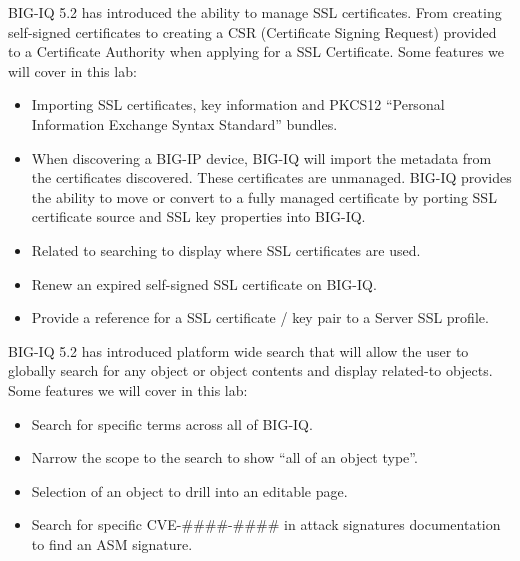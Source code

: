 \documentclass[letterpaper,10pt,english]{sphinxmanual}
\begin{document}
BIG-IQ 5.2 has introduced the ability to manage SSL certificates. From
creating self-signed certificates to creating a CSR (Certificate Signing
Request) provided to a Certificate Authority when applying for a SSL
Certificate. Some features we will cover in this lab:
\begin{itemize}
\item {} 
Importing SSL certificates, key information and PKCS12 “Personal
Information Exchange Syntax Standard” bundles.

\item {} 
When discovering a BIG-IP device, BIG-IQ will import the metadata
from the certificates discovered. These certificates are unmanaged.
BIG-IQ provides the ability to move or convert to a fully managed
certificate by porting SSL certificate source and SSL key properties
into BIG-IQ.

\item {} 
Related to searching to display where SSL certificates are used.

\item {} 
Renew an expired self-signed SSL certificate on BIG-IQ.

\item {} 
Provide a reference for a SSL certificate / key pair to a Server SSL
profile.

\end{itemize}


BIG-IQ 5.2 has introduced platform wide search that will allow the user
to globally search for any object or object contents and display
related-to objects. Some features we will cover in this lab:
\begin{itemize}
\item {} 
Search for specific terms across all of BIG-IQ.

\item {} 
Narrow the scope to the search to show “all of an object type”.

\item {} 
Selection of an object to drill into an editable page.

\item {} 
Search for specific CVE-\#\#\#\#-\#\#\#\# in attack signatures documentation
to find an ASM signature.

\end{itemize}

\end{document}
